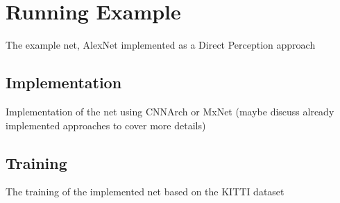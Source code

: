 \chapter{Running Example}

The example net, AlexNet \cite{krizhevsky2012imagenet} implemented as a Direct Perception approach 

\section{Implementation}

Implementation of the net using CNNArch or MxNet
(maybe discuss already implemented approaches to cover more details)

\section{Training}

The training of the implemented net based on the KITTI dataset \cite{geiger2013vision}
